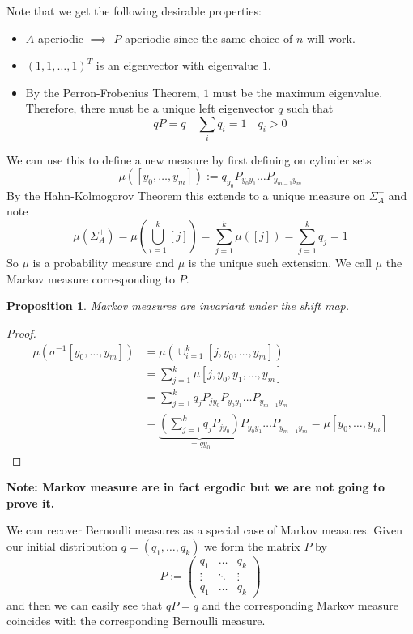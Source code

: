 \documentclass[11pt]{article}
\newcommand{\defeq}{:=}
\newcommand{\mdf}[1]{{\color{RoyalBlue} #1}}
\newenvironment{note}
	{\begin{mdframed}[backgroundcolor=white, linecolor=RubineRed, roundcorner=5pt, linewidth=1pt]\bfseries{Note:}\normalfont}
	{\end{mdframed}}
\newtheorem{prop}{Proposition}[section]
\begin{document}
Note that we get the following desirable properties:
\begin{itemize}
	\item $A$ aperiodic $\implies$ $P$ aperiodic since the same choice of $n$ will work.
	\item $(1, 1, \dots, 1)^T$ is an eigenvector with eigenvalue $1$.
	\item By the Perron-Frobenius Theorem, $1$ must be the maximum eigenvalue.
		Therefore, there must be a unique left eigenvector $q$ such that
		\[
			qP = q \quad \sum_{i}q_i = 1\quad q_i >0
		\]
\end{itemize}
We can use this to define a new measure by first defining on cylinder sets
\[
	\mu(\left[ y_0, \dots, y_m \right]) \defeq q_{y_0}P_{y_0 y_1}\dots P_{y_{m-1}y_m}
\]
By the Hahn-Kolmogorov Theorem this extends to a unique measure on $\Sigma_A^+$ and note
\[
	\mu(\Sigma_A^+)=\mu\left( \bigcup_{i=1}^k [j] \right)=\sum_{j=1}^k \mu( \left[ j\right]) = \sum_{j=1}^k q_j =1
\]
So $\mu$ is a probability measure and $\mu$ is the unique such extension.
We call $\mu$ the \mdf{Markov measure corresponding to $P$}.

\begin{prop}
Markov measures are invariant under the shift map.
\end{prop}

\begin{proof}
\begin{align*}
	\mu(\sigma^{-1}[y_0, \dots, y_m]) &= \mu\left( \cup_{i=1}^k [j, y_0, \dots, y_m]\right) \\
									  &= \sum_{j=1}^k\mu[j, y_0, y_1, \dots, y_m] \\
									  &= \sum_{j=1}^k q_jP_{j y_0} P_{y_0 y_1} \dots P_{y_{m-1} y_m} \\
									  &= \underbrace{\left( \sum_{j=1}^k q_j P_{j y_0}\right)}_{=qy_0}P_{y_0 y_1} \dots P_{y_{m-1} y_m}
									  = \mu[y_0, \dots, y_m]
\end{align*}
\end{proof}

\begin{note}
Markov measure are in fact ergodic but we are not going to prove it.
\end{note}

We can recover Bernoulli measures as a special case of Markov measures.
Given our initial distribution $q=(q_1, \dots, q_k)$ we form the matrix $P$ by
\[
P\defeq
\begin{pmatrix}
	q_1 & \dots & q_k \\
	\vdots & \ddots & \vdots \\
	q_1 & \dots & q_k
\end{pmatrix}
\]
and then we can easily see that $qP=q$ and the corresponding Markov measure coincides with the corresponding Bernoulli measure.
\end{document}
